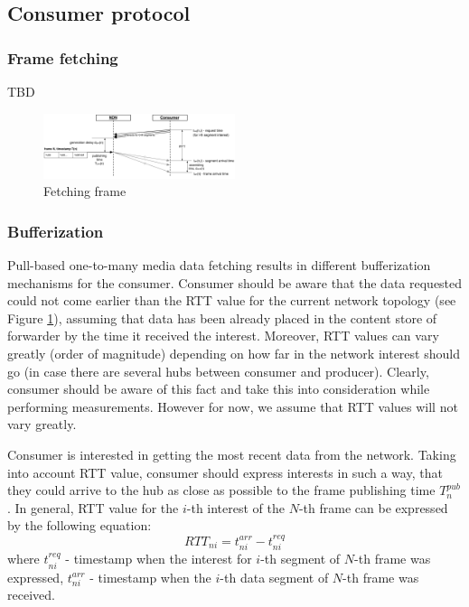 \documentclass[10pt]{proc}
\begin{document}
\subsection{Consumer protocol}

\subsubsection{Frame fetching}
TBD

\begin{figure}[Ht!]
\centering
\includegraphics[width=0.5\textwidth]{pull}
\caption{Fetching frame}
\label{fig:pull}
\end{figure}

\subsubsection{Bufferization}

Pull-based one-to-many media data fetching results in different bufferization mechanisms for the consumer. Consumer should be aware that the data requested could not come earlier than the RTT value for the current network topology (see Figure \ref{fig:pull}), assuming that data has been already placed in the content store of forwarder by the time it received the interest. Moreover, RTT values can vary greatly (order of magnitude) depending on how far in the network interest should go (in case there are several hubs between consumer and producer). Clearly, consumer should be aware of this fact and take this into consideration while performing measurements. However for now, we assume that RTT values will not vary greatly.

Consumer is interested in getting the most recent data from the network. Taking into account RTT value, consumer should express interests in such a way, that they could arrive to the hub as close as possible to the frame publishing time $T^{pub}_{n}$. In general, RTT value for the $i$-th interest of the $N$-th frame can be expressed by the following equation:
\begin{equation}
RTT_{ni} = t^{arr}_{ni} - t^{req}_{ni}
\end{equation}
where $t^{req}_{ni}$ - timestamp when the interest for $i$-th segment of $N$-th frame was expressed, $t^{arr}_{ni}$ - timestamp when the $i$-th data segment of $N$-th frame was received.
\end{document}
